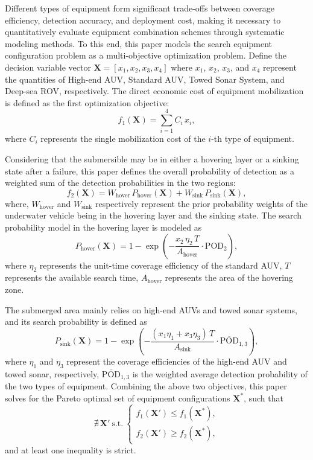 \documentclass{mcmthesis}
\begin{document}
Different types of equipment form significant trade-offs between coverage efficiency, detection accuracy, and deployment cost, making it necessary to quantitatively evaluate equipment combination schemes through systematic modeling methods.
To this end, this paper models the search equipment configuration problem as a multi-objective optimization problem.
Define the decision variable vector
$
\mathbf{X}=[x_1, x_2, x_3, x_4]
$
where $x_1$, $x_2$, $x_3$, and $x_4$ represent the quantities of High-end AUV, Standard AUV, Towed Sonar System, and Deep-sea ROV, respectively.
The direct economic cost of equipment mobilization is defined as the first optimization objective:
\begin{equation}
f_1(\mathbf{X})=\sum_{i=1}^{4} C_i\,x_i,
\end{equation}
where $C_i$ represents the single mobilization cost of the $i$-th type of equipment.

Considering that the submersible may be in either a hovering layer or a sinking state after a failure,
this paper defines the overall probability of detection as a weighted sum of the detection probabilities in the two regions:
\begin{equation}
f_2(\mathbf{X}) =
W_{\mathrm{hover}}\,P_{\mathrm{hover}}(\mathbf{X})
+
W_{\mathrm{sink}}\,P_{\mathrm{sink}}(\mathbf{X}),
\end{equation}
where, $W_{\mathrm{hover}}$ and $W_{\mathrm{sink}}$
respectively represent the prior probability weights of the underwater vehicle being in the hovering layer and the sinking state.
The search probability model in the hovering layer is modeled as
\begin{equation}
P_{\mathrm{hover}}(\mathbf{X})
=
1-\exp\!\left(
-\frac{x_2\,\eta_2\,T}{A_{\mathrm{hover}}}\cdot \mathrm{POD}_2
\right),
\end{equation}
where $\eta_2$ represents the unit-time coverage efficiency of the standard AUV,
$T$ represents the available search time,
$A_{\mathrm{hover}}$ represents the area of the hovering zone.

The submerged area mainly relies on high-end AUVs and towed sonar systems, and its search probability is defined as
\begin{equation}
P_{\mathrm{sink}}(\mathbf{X})
=
1-\exp\!\left(
-\frac{(x_1\eta_1+x_3\eta_3)\,T}{A_{\mathrm{sink}}}
\cdot \overline{\mathrm{POD}}_{1,3}
\right),
\end{equation}
where $\eta_1$ and $\eta_3$ represent the coverage efficiencies of the high-end AUV and towed sonar, respectively,
$\overline{\mathrm{POD}}_{1,3}$ is the weighted average detection probability of the two types of equipment.
Combining the above two objectives, this paper solves for the Pareto optimal set of equipment configurations $\mathbf{X}^*$,
such that
\begin{equation}
\nexists\,\mathbf{X}'\ \text{s.t.}\
\begin{cases}
f_1(\mathbf{X}') \le f_1(\mathbf{X}^*),\\
f_2(\mathbf{X}') \ge f_2(\mathbf{X}^*),
\end{cases}
\end{equation}
and at least one inequality is strict.
\end{document}
